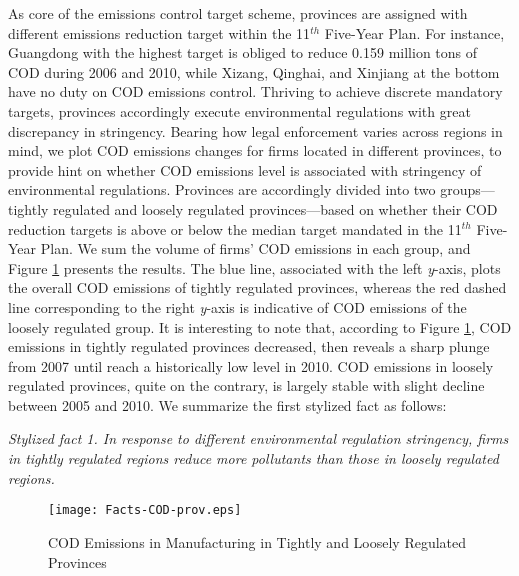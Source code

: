 \documentclass[12pt,english]{article}
\begin{document}
As core of the emissions control target scheme, provinces are assigned with different emissions reduction target within the 11$^{th}$ Five-Year Plan. For instance, Guangdong with the highest target is obliged to reduce 0.159 million tons of COD during 2006 and 2010, while Xizang, Qinghai, and Xinjiang at the bottom have no duty on COD emissions control. Thriving to achieve discrete mandatory targets, provinces accordingly execute environmental regulations with great discrepancy in stringency. Bearing how legal enforcement varies across regions in mind, we plot COD emissions changes for firms located in different provinces, to provide hint on whether COD emissions level is associated with stringency of environmental regulations. Provinces are accordingly divided into two groups---tightly regulated and loosely regulated provinces---based on whether their COD reduction targets is above or below the median target mandated in the 11$^{th}$ Five-Year Plan. We sum the volume of firms' COD emissions in each group, and Figure \ref{fig:COD provinces} presents the results. The blue line, associated with the left \emph{y}-axis, plots the overall COD emissions of tightly regulated provinces, whereas the red dashed line corresponding to the right \emph{y}-axis is indicative of COD emissions of the loosely regulated group. It is interesting to note that, according to Figure \ref{fig:COD provinces}, COD emissions in tightly regulated provinces decreased, then reveals a sharp plunge from 2007 until reach a historically low level in 2010. COD emissions in loosely regulated provinces, quite on the contrary, is largely stable with slight decline between 2005 and 2010. We summarize the first stylized fact as follows:

\textit{Stylized fact 1. In response to different environmental regulation stringency, firms in tightly regulated regions reduce more pollutants than those in loosely regulated regions.}

\begin{figure}[htbp]
	\caption{COD Emissions in Manufacturing in Tightly and Loosely Regulated Provinces}
	\label{fig:COD provinces}
	\centering
	\texttt{[image: Facts-COD-prov.eps]}
\end{figure}
\end{document}
